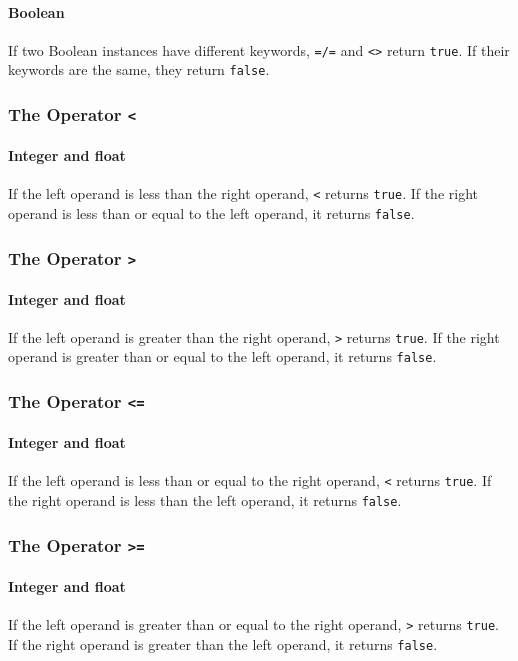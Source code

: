 \paragraph{Boolean}
If two Boolean instances have different keywords, \verb!=/=! and \verb!<>! return \verb!true!. If their keywords are the same, they return \verb!false!.

\subsubsection{The Operator {\tt <}}
\paragraph{Integer and float}
If the left operand is less than the right operand, \verb!<! returns \verb!true!. If the right operand is less than or equal to the left operand, it returns \verb!false!.

\subsubsection{The Operator {\tt >}}
\paragraph{Integer and float}
If the left operand is greater than the right operand, \verb!>! returns \verb!true!. If the right operand is greater than or equal to the left operand, it returns \verb!false!.

\subsubsection{The Operator {\tt <=}}
\paragraph{Integer and float}
If the left operand is less than or equal to the right operand, \verb!<! returns \verb!true!. If the right operand is less than the left operand, it returns \verb!false!.

\subsubsection{The Operator {\tt >=}}
\paragraph{Integer and float}
If the left operand is greater than or equal to the right operand, \verb!>! returns \verb!true!. If the right operand is greater than the left operand, it returns \verb!false!.

